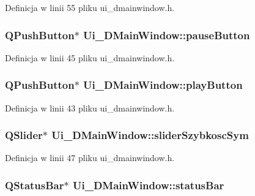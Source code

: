 Definicja w linii 55 pliku ui\-\_\-dmainwindow.\-h.

\hypertarget{class_ui___d_main_window_a70e142e35db4995a1fefa082406bdef3}{
\subsubsection[{pause\-Button}]{\setlength{\rightskip}{0pt plus 5cm}Q\-Push\-Button$\ast$ Ui\-\_\-\-D\-Main\-Window\-::pause\-Button}}\label{class_ui___d_main_window_a70e142e35db4995a1fefa082406bdef3}


Definicja w linii 45 pliku ui\-\_\-dmainwindow.\-h.

\hypertarget{class_ui___d_main_window_ad87cbf39ac14374923ed2a2b11e8b1bf}{
\subsubsection[{play\-Button}]{\setlength{\rightskip}{0pt plus 5cm}Q\-Push\-Button$\ast$ Ui\-\_\-\-D\-Main\-Window\-::play\-Button}}\label{class_ui___d_main_window_ad87cbf39ac14374923ed2a2b11e8b1bf}


Definicja w linii 43 pliku ui\-\_\-dmainwindow.\-h.

\hypertarget{class_ui___d_main_window_a8d12f07935a52a597e57eddf50e5c98f}{
\subsubsection[{slider\-Szybkosc\-Sym}]{\setlength{\rightskip}{0pt plus 5cm}Q\-Slider$\ast$ Ui\-\_\-\-D\-Main\-Window\-::slider\-Szybkosc\-Sym}}\label{class_ui___d_main_window_a8d12f07935a52a597e57eddf50e5c98f}


Definicja w linii 47 pliku ui\-\_\-dmainwindow.\-h.

\hypertarget{class_ui___d_main_window_ac9e025e7279839dd7ab1686456d1ae21}{
\subsubsection[{status\-Bar}]{\setlength{\rightskip}{0pt plus 5cm}Q\-Status\-Bar$\ast$ Ui\-\_\-\-D\-Main\-Window\-::status\-Bar}}\label{class_ui___d_main_window_ac9e025e7279839dd7ab1686456d1ae21}


